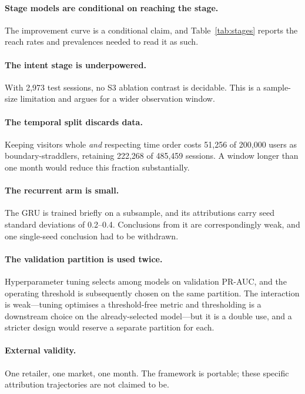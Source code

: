 \documentclass[review,3p,times,authoryear]{elsarticle}   %
\begin{document}
\paragraph{Stage models are conditional on reaching the stage.} The improvement
curve is a conditional claim, and Table~\ref{tab:stages} reports the reach rates and
prevalences needed to read it as such.

\paragraph{The intent stage is underpowered.} With 2,973 test sessions, no S3
ablation contrast is decidable. This is a sample-size limitation and argues for a
wider observation window.

\paragraph{The temporal split discards data.} Keeping visitors whole \emph{and}
respecting time order costs 51,256 of 200,000 users as boundary-straddlers,
retaining 222,268 of 485,459 sessions. A window longer than one month would reduce
this fraction substantially.

\paragraph{The recurrent arm is small.} The GRU is trained briefly on a subsample,
and its attributions carry seed standard deviations of 0.2--0.4. Conclusions from it
are correspondingly weak, and one single-seed conclusion had to be withdrawn.

\paragraph{The validation partition is used twice.} Hyperparameter tuning selects
among models on validation PR-AUC, and the operating threshold is subsequently
chosen on the same partition. The interaction is weak---tuning optimises a
threshold-free metric and thresholding is a downstream choice on the
already-selected model---but it is a double use, and a stricter design would
reserve a separate partition for each.

\paragraph{External validity.} One retailer, one market, one month. The framework is
portable; these specific attribution trajectories are not claimed to be.
\end{document}
